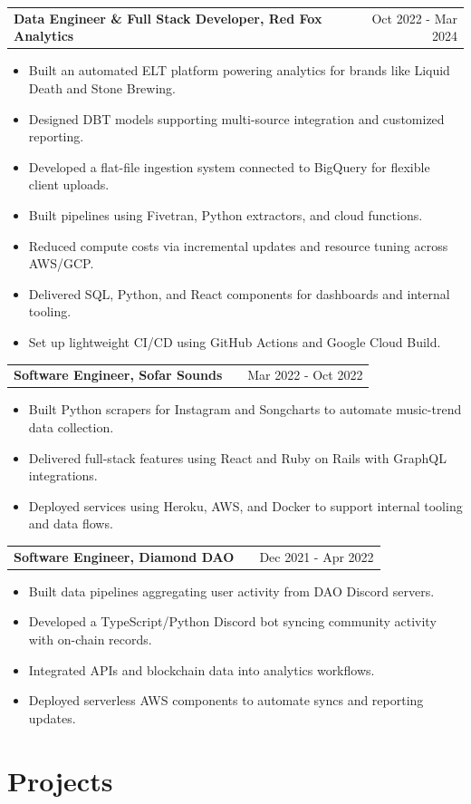 \documentclass[a4paper,12pt]{article}
\makeatletter
\newenvironment{joblong}[2]
    {
    \begin{tabularx}{\linewidth}{@{}l X r@{}}
    \textbf{#1} & \hfill &  #2 \\[3.75pt]
    \end{tabularx}
    \begin{minipage}[t]{\linewidth}
    \begin{itemize}[nosep,after=\strut, leftmargin=1em, itemsep=3pt,label=--]
    }
    {
    \end{itemize}
    \end{minipage}    
    }
\makeatother
\begin{document}
\begin{joblong}{Data Engineer \& Full Stack Developer, Red Fox Analytics}{Oct 2022 - Mar 2024}
\item Built an automated ELT platform powering analytics for brands like Liquid Death and Stone Brewing.
\item Designed DBT models supporting multi-source integration and customized reporting.
\item Developed a flat-file ingestion system connected to BigQuery for flexible client uploads.
\item Built pipelines using Fivetran, Python extractors, and cloud functions.
\item Reduced compute costs via incremental updates and resource tuning across AWS/GCP.
\item Delivered SQL, Python, and React components for dashboards and internal tooling.
\item Set up lightweight CI/CD using GitHub Actions and Google Cloud Build.
\end{joblong}

\begin{joblong}{Software Engineer, Sofar Sounds}{Mar 2022 - Oct 2022}
\item Built Python scrapers for Instagram and Songcharts to automate music-trend data collection.
\item Delivered full-stack features using React and Ruby on Rails with GraphQL integrations.
\item Deployed services using Heroku, AWS, and Docker to support internal tooling and data flows.
\end{joblong}

\begin{joblong}{Software Engineer, Diamond DAO}{Dec 2021 - Apr 2022}
\item Built data pipelines aggregating user activity from DAO Discord servers.
\item Developed a TypeScript/Python Discord bot syncing community activity with on-chain records.
\item Integrated APIs and blockchain data into analytics workflows.
\item Deployed serverless AWS components to automate syncs and reporting updates.
\end{joblong}
  
\section{Projects}
\end{document}
